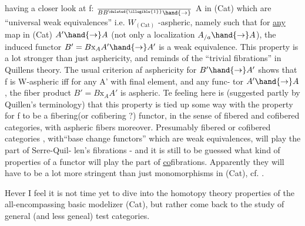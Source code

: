 having a closer look at   f: $\over{B}{B}^{\deleted{\illegible{1}}}\hand{\to}$ A in (Cat) which are ``universal
weak equivalences'' i.e. $W_{(\mathrm{Cat})}$ -aspheric, namely such that for \uline{any} map
in (Cat) $A'\hand{\to}A$ (not only a localization $A_{/a}\hand{\to}A$), the induced
functor $B'=B\mathrm{x}_A A'\hand{\to}A'$ is a weak equivalence. This property is a lot
stronger than just asphericity, and reminds of the ``trivial fibrations''
in Quillens theory. The usual criterion af asphericity for $B'\hand{\to}A'$ shows
that f is W-aspheric iff  for any A' with final element, and any func-%
tor $A'\hand{\to}A$, the fiber product $B'=B\mathrm{x}_A A'$ is aspheric. Te feeling here is
(suggested partly by Quillen's terminology) that this property is tied up
some way with the property for f to be a fibering(or cofibering ?) functor,
in the sense of fibered and cofibered categories, with aspheric fibers
moreover. Presumably fibered or cofibered categories , with``base change
functors'' which are weak equivalences, will play the part of Serre-Quil-%
len's fibrations - and it is still to be guessed what kind of 
properties of a functor will play the part of \uline{co}fibrations. Apparently
they will have to be a lot more stringent than just monomorphisms in (Cat),
cf.  .

Hever I feel it is not time yet to dive into the homotopy theory
properties of the all-encompassing basic modelizer (Cat), but rather come
back to the study of general (and less geneal) test categories.


